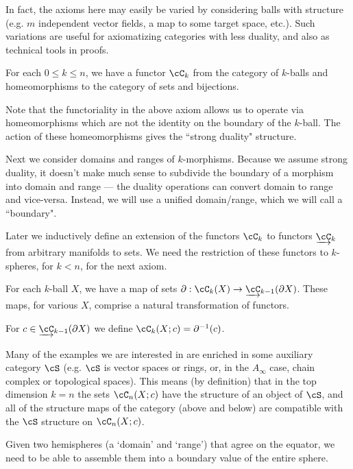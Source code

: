 \documentclass{pnastwo}
\begin{document}
\begin{article}
In fact, the axioms here may easily be varied by considering balls with structure (e.g. $m$ independent vector fields, a map to some target space, etc.). Such variations are useful for axiomatizing categories with less duality, and also as technical tools in proofs.

\begin{axiom}[Morphisms]
\label{axiom:morphisms}
For each $0 \le k \le n$, we have a functor $\cC_k$ from 
the category of $k$-balls and 
homeomorphisms to the category of sets and bijections.
\end{axiom}

Note that the functoriality in the above axiom allows us to operate via
homeomorphisms which are not the identity on the boundary of the $k$-ball.
The action of these homeomorphisms gives the ``strong duality" structure.

Next we consider domains and ranges of $k$-morphisms.
Because we assume strong duality, it doesn't make much sense to subdivide the boundary of a morphism
into domain and range --- the duality operations can convert domain to range and vice-versa.
Instead, we will use a unified domain/range, which we will call a ``boundary".

Later \todo{} we inductively define an extension of the functors $\cC_k$ to functors $\cl{\cC}_k$ from arbitrary manifolds to sets. We need the restriction of these functors to $k$-spheres, for $k<n$, for the next axiom.

\begin{axiom}[Boundaries]\label{nca-boundary}
For each $k$-ball $X$, we have a map of sets $\bd: \cC_k(X)\to \cl{\cC}_{k-1}(\bd X)$.
These maps, for various $X$, comprise a natural transformation of functors.
\end{axiom}

For $c\in \cl{\cC}_{k-1}(\bd X)$ we define $\cC_k(X; c) = \bd^{-1}(c)$.

Many of the examples we are interested in are enriched in some auxiliary category $\cS$
(e.g. $\cS$ is vector spaces or rings, or, in the $A_\infty$ case, chain complex or topological spaces).
This means (by definition) that in the top dimension $k=n$ the sets $\cC_n(X; c)$ have the structure
of an object of $\cS$, and all of the structure maps of the category (above and below) are
compatible with the $\cS$ structure on $\cC_n(X; c)$.


Given two hemispheres (a `domain' and `range') that agree on the equator, we need to be able to assemble them into a boundary value of the entire sphere.


\end{article}
\end{document}
